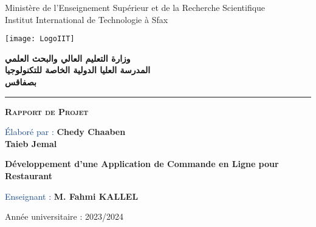 \thispagestyle{empty} %

\hspace{-40pt}
\begin{minipage}[c]{0.33\columnwidth} %
    \vspace{6mm}
    \centering
    \begingroup
    \setmainfont{Arimo}
        Ministère de l'Enseignement Supérieur et de la Recherche Scientifique\\
        Institut International de Technologie à Sfax
    \endgroup
\end{minipage}
\hfill %
\begin{minipage}[c]{0.33\columnwidth} %
    \texttt{[image: LogoIIT]}
\end{minipage}
\hfill %
\begin{minipage}[c]{0.33\columnwidth} %
    \vspace{0mm}
    \centering
    \begin{arab}%
        \textbf{وزارة التعليم العالي والبحث العلمي \\
        المدرسة العليا الدولية الخاصة للتكنولوجيا \\
        بصفاقس
        }
    \end{arab}
    
\end{minipage}
\hspace{-20pt}

\vskip5mm
\hrule

\vskip2.5cm

\begin{center}

\begin{center}
\fontsize{30pt}{1pt}\textbf{
\textsc{Rapport de Projet}
}
\end{center}

\vskip1cm


{\fontsize{12pt}{1pt}


\textcolor[HTML]{114388}{\textrm{Élaboré par : }}
\vskip0.1cm
    \textbf{Chedy Chaaben} \\
    \textbf{Taieb Jemal}
\vskip2cm
}
\begin{tcolorbox}[colframe=black, colback=white, 
    toprule=2pt, bottomrule=2pt, 
    leftrule=0pt, rightrule=0pt, 
    arc=0mm]
    \centering
     {\fontsize{30}{38}\montserrat\textbf{Développement d'une Application de Commande en Ligne pour Restaurant}}
\end{tcolorbox}

\vskip2.5cm

{\fontsize{15pt}{1pt}
\textcolor[HTML]{114388}{\textrm{Enseignant : }}
    \textbf{ M. Fahmi KALLEL}
\vskip2.5cm
}


{\fontsize{18pt}{1pt}
Année universitaire : 2023/2024
}
\end{center}